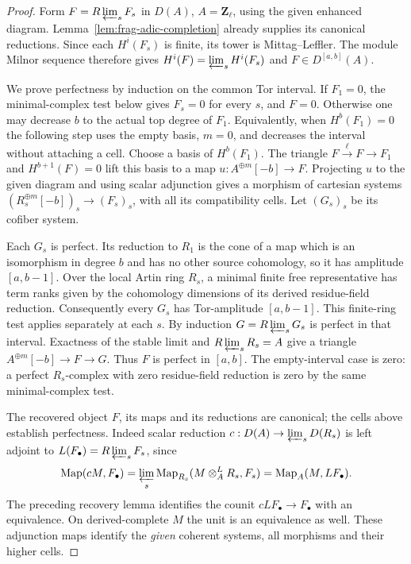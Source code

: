 \documentclass[11pt]{article}
\theoremstyle{definition}
\theoremstyle{remark}
\begin{document}
\begin{proof}
Form $F=R\varprojlim_sF_s$ in $D(A)$, $A=\mathbf Z_\ell$,
using the given enhanced diagram.  Lemma~\ref{lem:frag-adic-completion}
already supplies its canonical reductions.  Since each $H^i(F_s)$
is finite, its tower is Mittag--Leffler.  The module Milnor sequence
therefore gives $H^i(F)=\varprojlim_sH^i(F_s)$ and $F\in D^{[a,b]}(A)$.

We prove perfectness by induction on the common Tor interval.  If $F_1=0$, the
minimal-complex test below gives $F_s=0$ for every $s$, and $F=0$.
Otherwise one may decrease $b$ to the actual top degree of $F_1$.
Equivalently, when $H^b(F_1)=0$ the following step uses the empty
basis, $m=0$, and decreases the interval without attaching a cell.
Choose a basis of $H^b(F_1)$.  The triangle $F\xrightarrow{\ell}F\to F_1$ and
$H^{b+1}(F)=0$ lift this basis to a map
$u:A^{\oplus m}[-b]\to F$.  Projecting $u$ to the given diagram
and using scalar adjunction gives a morphism of cartesian systems
$(R_s^{\oplus m}[-b])_s\to(F_s)_s$, with all its compatibility cells.
Let $(G_s)_s$ be its cofiber system.

Each $G_s$ is perfect.  Its reduction to $R_1$ is the cone of a map
which is an isomorphism in degree $b$ and has no other source
cohomology, so it has amplitude $[a,b-1]$.  Over the local Artin ring
$R_s$, a minimal finite free representative has term ranks given
by the cohomology dimensions of its derived residue-field reduction.
Consequently every $G_s$ has Tor-amplitude $[a,b-1]$.  This finite-ring test applies separately at each $s$.  By induction $G=R\varprojlim_sG_s$ is perfect
in that interval.  Exactness of the stable limit and
$R\varprojlim_sR_s=A$ give a triangle
$A^{\oplus m}[-b]\to F\to G$.  Thus $F$ is perfect in $[a,b]$.
The empty-interval case is zero: a perfect $R_s$-complex with zero
residue-field reduction is zero by the same minimal-complex test.

The recovered object $F$, its maps and its reductions are canonical;
the cells above establish perfectness.  Indeed scalar reduction
$c:D(A)\to\varprojlim_sD(R_s)$ is left adjoint to
$L(F_\bullet)=R\varprojlim_sF_s$, since
\[
 \operatorname{Map}(cM,F_\bullet)
 =\varprojlim_s\operatorname{Map}_{R_s}(M\otimes_A^LR_s,F_s)
 =\operatorname{Map}_A(M,LF_\bullet).
\]
The preceding recovery lemma identifies the counit $cL F_\bullet\to
F_\bullet$ with an equivalence.  On derived-complete $M$ the unit
is an equivalence as well.  These adjunction maps identify the
\emph{given} coherent systems, all morphisms and their higher cells.
\end{proof}
\end{document}
